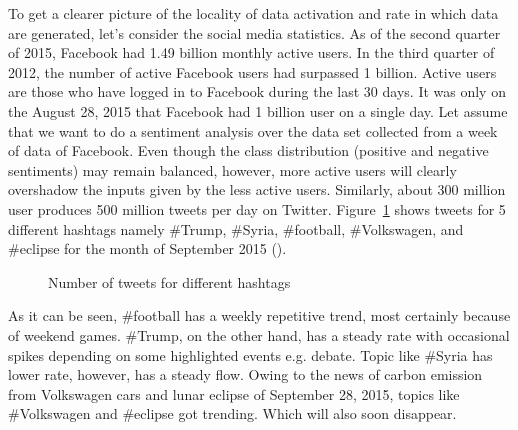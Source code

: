 To get a clearer picture of the locality of data activation and rate in which data are generated, let's consider the social media statistics. As of the second quarter of 2015, Facebook had 1.49 billion monthly active users. In the third quarter of 2012, the number of active Facebook users had surpassed 1 billion. Active users are those who have logged in to Facebook during the last 30 days. It was only on the August 28, 2015 that Facebook had 1 billion user on a single day. Let assume that we want to do a sentiment analysis over the data set collected from a week of data of Facebook. Even though the class distribution (positive and negative sentiments)  may remain balanced, however, more active users will clearly overshadow the inputs given by the less active users. Similarly, about 300 million user produces 500 million tweets per day on Twitter. Figure~\ref{fig:intro:tweets} shows tweets for 5 different hashtags namely \#Trump, \#Syria, \#football, \#Volkswagen, and \#eclipse for the month of September 2015 (\cite{internet:topsy:tweets}). 
\begin{figure}[htbp] 
    \begin{center}
        \caption{Number of tweets for different hashtags }
        \label{fig:intro:tweets}
    \end{center}
\end{figure}
\noindent As it can be seen, \#football has a weekly repetitive trend, most certainly because of weekend games. \#Trump, on the other hand, has a steady rate with occasional spikes depending on some highlighted events e.g. debate. Topic like \#Syria has lower rate, however, has a steady flow. Owing to the news of carbon emission from Volkswagen cars and lunar eclipse of September 28, 2015, topics like \#Volkswagen and \#eclipse got trending. Which will also soon disappear.

